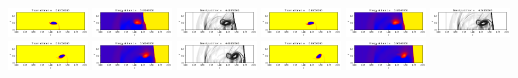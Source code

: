 \documentclass[11pt]{article}
\begin{document}
\includegraphics[width=0.15833333333333333\textwidth]{frame0007fig1.png}
\includegraphics[width=0.15833333333333333\textwidth]{frame0007fig2.png}
\vskip 10pt 
\includegraphics[width=0.15833333333333333\textwidth]{frame0008fig0.png}
\includegraphics[width=0.15833333333333333\textwidth]{frame0008fig1.png}
\includegraphics[width=0.15833333333333333\textwidth]{frame0008fig2.png}
\includegraphics[width=0.15833333333333333\textwidth]{frame0009fig0.png}
\includegraphics[width=0.15833333333333333\textwidth]{frame0009fig1.png}
\includegraphics[width=0.15833333333333333\textwidth]{frame0009fig2.png}
\vskip 10pt 
\includegraphics[width=0.15833333333333333\textwidth]{frame0010fig0.png}
\includegraphics[width=0.15833333333333333\textwidth]{frame0010fig1.png}
\includegraphics[width=0.15833333333333333\textwidth]{frame0010fig2.png}
\end{document}
